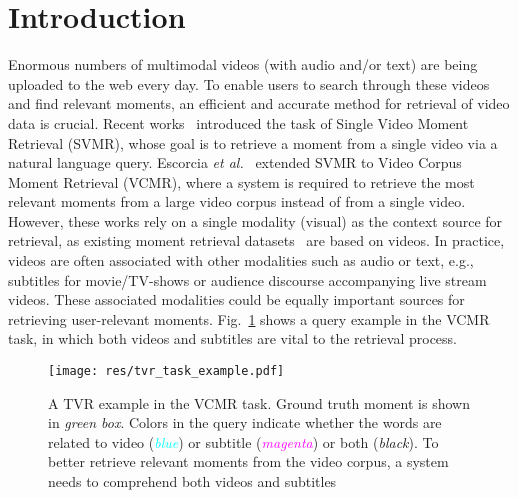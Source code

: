 \documentclass[runningheads]{llncs}
\begin{document}
\section{Introduction}\label{introuction}
Enormous numbers of multimodal videos (with audio and/or text) are being uploaded to the web every day. To enable users to search through these videos and find relevant moments, an efficient and accurate method for retrieval of video data is crucial. 
Recent works~\cite{anne2017localizing,gao2017tall} introduced the task of Single Video Moment Retrieval (SVMR), whose goal is to retrieve a moment from a single video via a natural language query. 
Escorcia \emph{et al.}~\cite{escorcia2019temporal} extended SVMR to Video Corpus Moment Retrieval (VCMR), where a system is required to retrieve the most relevant moments from a large video corpus instead of from a single video. 
However, these works rely on a single modality (visual) as the context source for retrieval, as existing moment retrieval datasets~\cite{anne2017localizing,regneri2013grounding,gao2017tall,Krishna2017DenseCaptioningEI} are based on videos.
In practice, videos are often associated with other modalities such as audio or text, e.g., subtitles for movie/TV-shows or audience discourse accompanying live stream videos. 
These associated modalities could be equally important sources for retrieving user-relevant moments. Fig.~\ref{fig:query_example} shows a query example in the VCMR task, in which both videos and subtitles are vital to the retrieval process.

\begin{figure}[!t]
  \centering
  \texttt{[image: res/tvr\_task\_example.pdf]}
  \caption{A TVR example in the VCMR task. Ground truth moment is shown in \textit{green box}. Colors in the query indicate whether the words are related to video (\textit{\textcolor{ cyan}{blue}}) or subtitle (\textit{\textcolor{magenta}{magenta}}) or both (\textit{black}). To better retrieve relevant moments from the video corpus, a system needs to comprehend both videos and subtitles}
  \label{fig:query_example}
\end{figure}
\end{document}
